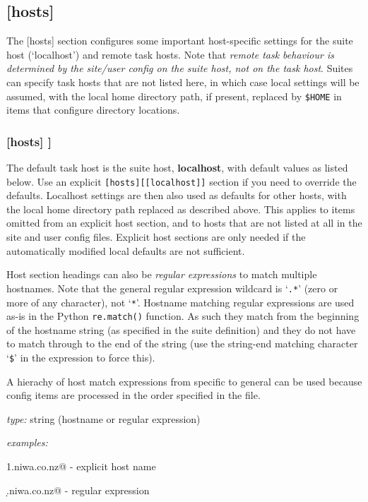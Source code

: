\subsection{[hosts]}

The [hosts] section configures some important host-specific settings for
the suite host (`localhost') and remote task hosts. Note that {\em
remote task behaviour is determined by the site/user config on the
suite host, not on the task host}. Suites can specify task hosts that
are not listed here, in which case local settings will be assumed,
with the local home directory path, if present, replaced by
\lstinline=$HOME= in items that configure directory locations.

\subsubsection[{[[}HOST{]]}]{[hosts] \textrightarrow [[HOST]]}

The default task host is the suite host, {\bf localhost}, with default
values as listed below. Use an explicit \lstinline=[hosts][[localhost]]=
section if you need to override the defaults. Localhost settings are
then also used as defaults for other hosts, with the local home
directory path replaced as described above. This applies to items
omitted from an explicit host section, and to hosts that are not listed
at all in the site and user config files.  Explicit host sections are only
needed if the automatically modified local defaults are not sufficient.

Host section headings can also be {\em regular expressions} to match
multiple hostnames.  Note that the general regular expression wildcard
is `\lstinline=.*=' (zero or more of any character), not
`\lstinline=*='.
Hostname matching regular expressions are used as-is in the Python
\lstinline=re.match()= function. As such they match from the beginning
of the hostname string (as specified in the suite definition) and they
do not have to match through to the end of the string (use the
string-end matching character `\lstinline=$=' in the expression to
force this).

A hierachy of host match expressions from specific to general can be
used because config items are processed in the order specified in the
file.

\begin{myitemize}
\item {\em type:} string (hostname or regular expression)
\item {\em examples:}
\begin{myitemize}
    \item \lstinline@server1.niwa.co.nz@ - explicit host name
    \item  \lstinline@server\d.niwa.co.nz@ - regular expression
\end{myitemize}
\end{myitemize}

